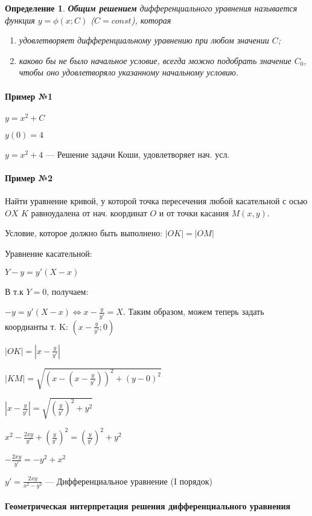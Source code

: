 \documentclass{article}
\newtheorem{definition}{Определение}
\begin{document}
\begin{definition}
    \textbf{Общим решением} дифференциального уравнения называется функция $y = \phi(x; C)$ ($C = const$), которая
    
    \begin{enumerate}
        \item удовлетворяет дифференциальному уравнению при любом значении $C$;
        \item каково бы не было начальное условие, всегда можно подобрать значение $C_0$, чтобы оно удовлетворяло указанному начальному условию.
    \end{enumerate}
\end{definition}

\paragraph{Пример №1}

$y = x^2 + C$

$y(0) = 4$

$y = x^2 + 4$ — Решение задачи Коши, удовлетворяет нач. усл.

\paragraph{Пример №2}

Найти уравнение кривой, у которой точка пересечения любой касательной с осью $OX$ $K$ равноудалена от нач. координат $O$ и от точки касания $M(x, y)$.

Условие, которое должно быть выполнено: $|OK| = |OM|$

Уравнение касательной:

$Y - y = y' (X - x)$

В т.к $Y = 0$, получаем:

$-y = y'(X - x) \Leftrightarrow x - \frac{y}{y'} = X$. Таким образом, можем теперь задать коордианты т. K: $(x - \frac{y}{y'}; 0)$

$|OK| = |x - \frac{y}{y'}|$

$|KM| = \sqrt{(x - (x - \frac{y}{y'}))^2 + (y - 0)^2}$

$|x - \frac{y}{y'}| = \sqrt{(\frac{y}{y'})^2 + y^2}$

$x^2 - \frac{2xy}{y'} + (\frac{y}{y'})^2 = (\frac{y}{y'})^2 + y^2$

$-\frac{2xy}{y'} = -y^2 + x^2$

$y' = \frac{2xy}{x^2-y^2}$ — Дифференциальное уравнение (I порядок)

\paragraph{Геометрическая интерпретация решения дифференциального уравнения}
\end{document}
